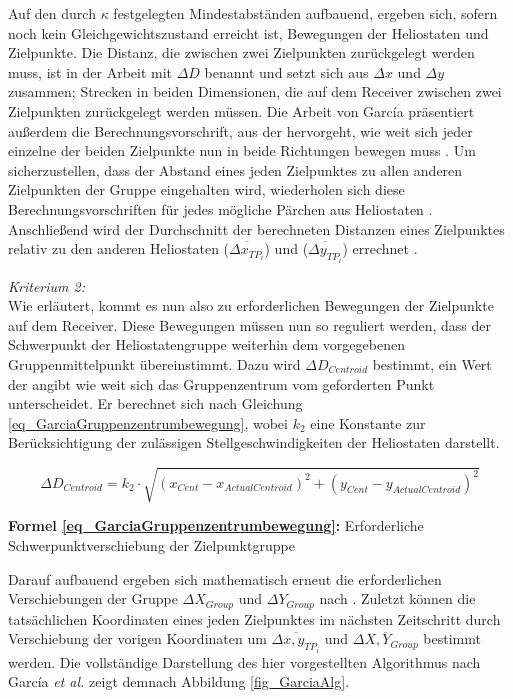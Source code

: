 Auf den durch $\kappa$ festgelegten Mindestabständen aufbauend, ergeben sich, sofern noch kein Gleichgewichtszustand erreicht ist, Bewegungen der Heliostaten und Zielpunkte.
Die Distanz, die zwischen zwei Zielpunkten zurückgelegt werden muss, ist in der Arbeit mit $\Delta D$ benannt und setzt sich aus $\Delta x$ und $\Delta y$ zusammen; Strecken in beiden Dimensionen, die auf dem Receiver zwischen zwei Zielpunkten zurückgelegt werden müssen.
Die Arbeit von García präsentiert außerdem die Berechnungsvorschrift, aus der hervorgeht, wie weit sich jeder einzelne der beiden Zielpunkte nun in beide Richtungen bewegen muss \cite[S.9-10]{Garcia2}.
Um sicherzustellen, dass der Abstand eines jeden Zielpunktes zu allen anderen Zielpunkten der Gruppe eingehalten wird, wiederholen sich diese Berechnungsvorschriften für jedes mögliche Pärchen aus Heliostaten \cite[S.9]{Garcia2}.
Anschließend wird der Durchschnitt der berechneten Distanzen eines Zielpunktes relativ zu den anderen Heliostaten ($\overline{\Delta x_{TP_i}}$) und ($\overline{\Delta y_{TP_i}}$) errechnet \cite[S.10]{Garcia2}.


\textit{Kriterium 2:}\\
Wie erläutert, kommt es nun also zu erforderlichen Bewegungen der Zielpunkte auf dem Receiver.
Diese Bewegungen müssen nun so reguliert werden, dass der Schwerpunkt der Heliostatengruppe weiterhin dem vorgegebenen Gruppenmittelpunkt übereinstimmt.
Dazu wird $\Delta D_{Centroid}$ bestimmt, ein Wert der angibt wie weit sich das Gruppenzentrum vom geforderten Punkt unterscheidet.
Er berechnet sich nach Gleichung \ref{eq_GarciaGruppenzentrumbewegung}, wobei $k_2$ eine Konstante zur Berücksichtigung der zulässigen Stellgeschwindigkeiten der Heliostaten darstellt. \cite[S.10]{Garcia2}

\begin{equation} \label{eq_GarciaGruppenzentrumbewegung}
    \Delta D_{Centroid} = k_2 \cdot \sqrt{\left(x_{Cent}-x_{Actual Centroid}\right)^2+\left(y_{Cent}-y_{Actual Centroid}\right)^2}
\end{equation}
\centerline{\small{\textsf{\textbf{Formel \ref{eq_GarciaGruppenzentrumbewegung}:}} Erforderliche Schwerpunktverschiebung der Zielpunktgruppe}}

Darauf aufbauend ergeben sich mathematisch erneut die erforderlichen Verschiebungen der Gruppe $\Delta X_{Group}$ und $\Delta Y_{Group}$ nach \cite[S.10]{Garcia2}.
Zuletzt können die tatsächlichen Koordinaten eines jeden Zielpunktes im nächsten Zeitschritt durch Verschiebung der vorigen Koordinaten um $\overline{\Delta x,y_{TP_i}}$ und $\overline{\Delta X,Y_{Group}}$ bestimmt werden.
Die vollständige Darstellung des hier vorgestellten Algorithmus nach García \textit{et al.} \cite{Garcia2} zeigt demnach Abbildung \ref{fig_GarciaAlg}.

